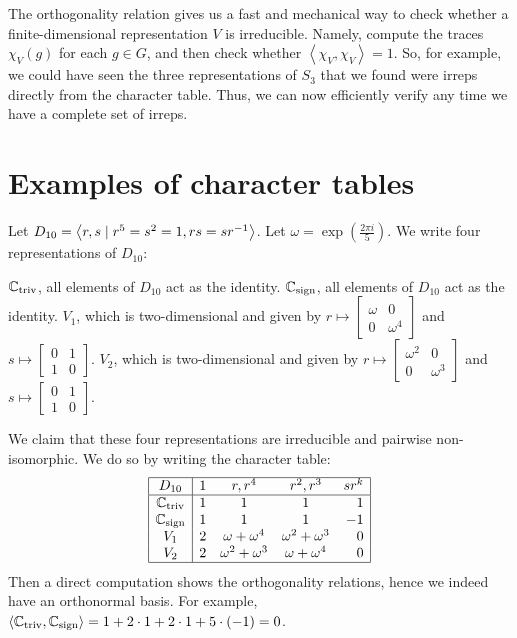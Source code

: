 The orthogonality relation gives us a fast and mechanical way to check
whether a finite-dimensional representation $V$ is irreducible.
Namely, compute the traces $\chi_V(g)$ for each $g \in G$,
and then check whether $\left< \chi_V, \chi_V \right> = 1$.
So, for example, we could have seen the three representations of
$S_3$ that we found were irreps directly from the character table.
Thus, we can now efficiently verify any time we have
a complete set of irreps.

\section{Examples of character tables}
\begin{example}
	Let $D_{10} = \left< r,s \mid r^5 = s^2 = 1, rs = sr^{-1} \right>$.
	Let $\omega = \exp(\frac{2\pi i}{5})$.
	We write four representations of $D_{10}$:
	\begin{itemize}
		\ii $\mathbb C_{\mathrm{triv}}$, all elements of $D_{10}$ act as the identity.
		\ii $\mathbb C_{\mathrm{sign}}$, all elements of $D_{10}$ act as the identity.
		\ii $V_1$, which is two-dimensional and given by
		$r \mapsto \begin{bmatrix} \omega & 0 \\ 0 & \omega^4 \end{bmatrix}$
		and $s \mapsto \begin{bmatrix} 0 & 1 \\ 1 & 0 \end{bmatrix}$.
		\ii $V_2$, which is two-dimensional and given by
		$r \mapsto \begin{bmatrix} \omega^2 & 0 \\ 0 & \omega^3 \end{bmatrix}$
		and $s \mapsto \begin{bmatrix} 0 & 1 \\ 1 & 0 \end{bmatrix}$.
	\end{itemize}
	We claim that these four representations are irreducible
	and pairwise non-isomorphic.
	We do so by writing the character table:
	\[
		\begin{array}{|c|rccr|}
			\hline
			D_{10} & 1 & r, r^4 & r^2, r^3 & sr^k \\ \hline
			\mathbb C_{\mathrm{triv}} & 1 & 1 & 1 & 1 \\
			\mathbb C_{\mathrm{sign}} & 1 & 1 & 1 & -1 \\
			V_1 & 2 & \omega+\omega^4 & \omega^2+\omega^3 & 0 \\
			V_2 & 2 & \omega^2+\omega^3 & \omega+\omega^4 & 0 \\ \hline
		\end{array}
	\]
	Then a direct computation shows the orthogonality relations,
	hence we indeed have an orthonormal basis.
	For example, $\left< \mathbb C_{\mathrm{triv}}, \mathbb C_{\mathrm{sign}} \right> = 1 + 2 \cdot 1 + 2 \cdot 1 + 5 \cdot (-1) = 0$.
\end{example}

